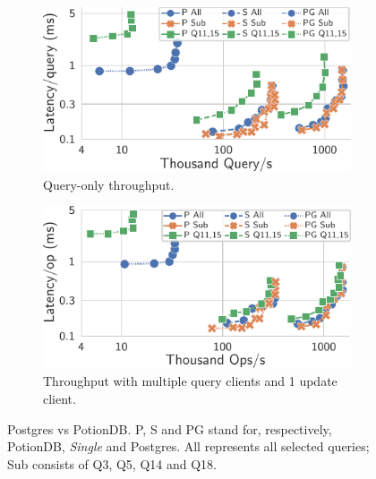 \documentclass[sigplan,twocolumn,review,anonymous]{acmart}
\begin{document}
\begin{figure}
	\centering
	\begin{subfigure}{.482\linewidth}
		\includegraphics[width=1\linewidth]{postgres/postgresQueryOnly}
		\caption{Query-only  throughput.}
		\label{fig:postgres_query}
		\vspace*{0.7em}
	\end{subfigure}%
	\hspace*{0.3em}
	\begin{subfigure}{.483\linewidth}
		\includegraphics[width=1\linewidth]{postgres/postgresUpdateOnlyOps}
		\caption{Throughput with multiple query clients and 1 update client.}
		\label{fig:postgres_update}
	\end{subfigure}%
	\vspace*{-0.65em}
	\caption{Postgres vs PotionDB. P, S and PG stand for, respectively, PotionDB, \emph{Single} and Postgres. All represents all selected queries;  Sub consists of Q3, Q5, Q14 and Q18.}
	\label{fig:postgres}
	\vspace*{-0.2em}
\end{figure}
\end{document}
